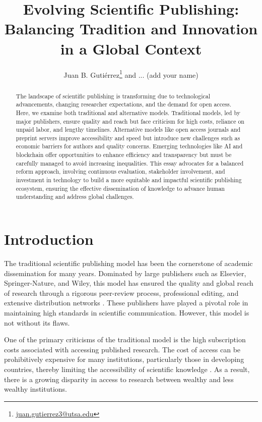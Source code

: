 \documentclass{article}
\title{Evolving Scientific Publishing: Balancing Tradition and Innovation in a Global Context}
\author{Juan B. Gutiérrez\footnote{\href{mailto:juan.gutierrez3@utsa.edu}{juan.gutierrez3@utsa.edu}} \phantom{ } and ... (add your name)}
\date{}
\begin{document}
\maketitle

\begin{abstract}
    The landscape of scientific publishing is transforming due to technological advancements, changing researcher expectations, and the demand for open access. Here, we examine both traditional and alternative models. Traditional models, led by major publishers, ensure quality and reach but face criticism for high costs, reliance on unpaid labor, and lengthy timelines. Alternative models like open access journals and preprint servers improve accessibility and speed but introduce new challenges such as economic barriers for authors and quality concerns. Emerging technologies like AI and blockchain offer opportunities to enhance efficiency and transparency but must be carefully managed to avoid increasing inequalities. This essay advocates for a balanced reform approach, involving continuous evaluation, stakeholder involvement, and investment in technology to build a more equitable and impactful scientific publishing ecosystem, ensuring the effective dissemination of knowledge to advance human understanding and address global challenges.
\end{abstract}

\section{Introduction}
The traditional scientific publishing model has been the cornerstone of academic dissemination for many years. Dominated by large publishers such as Elsevier, Springer-Nature, and Wiley, this model has ensured the quality and global reach of research through a rigorous peer-review process, professional editing, and extensive distribution networks \cite{lariviere2015oligopoly}. These publishers have played a pivotal role in maintaining high standards in scientific communication. However, this model is not without its flaws.

One of the primary criticisms of the traditional model is the high subscription costs associated with accessing published research. The cost of access can be prohibitively expensive for many institutions, particularly those in developing countries, thereby limiting the accessibility of scientific knowledge \cite{lariviere2015oligopoly}. As a result, there is a growing disparity in access to research between wealthy and less wealthy institutions.
\end{document}
